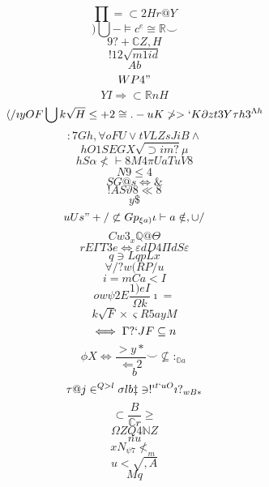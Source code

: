 \documentclass[12pt]{article}
\begin{document}
        \begin{minipage}[t][0pt]{\linewidth}

        \[\prod =\subset 2 H r @ Y\]
\[)\bigcup -\models c^{e}\cong\mathbb{R}\smile\]
\[9?+\mathbb{C} Z , H\]
\[!12\sqrt{m1id}\]
\[Ab\]
\[WP4"\]
\[YI\Rightarrow\subset\mathbb{R} n H\]
\[\langle /\imath y O F\bigcup k\sqrt{H}\leq + 2\cong . - u K\ngtr > ` K\partial z t 3 Y\tau h 3^{\Lambda h}\]
\[:7Gh, {\forall o F U}\lor t V L Z s J i B {\land}\]
\[hO1SEGX\sqrt{\supset i m ?}\mu\]
\[hS\alpha\nless\vdash 8 M 4\pi U a T u V 8\]
\[N9\leq 4\]
\[SG@s\Leftrightarrow\&\]
\[!AS\vartheta 8\ll 8\]
\[y\$\]
\[uUs"+/\not\subset G p_{\xi a )}\iota\vdash a\notin ,\cup /\]
\[Cw3_{x}\mathbb{Q} @\Theta\]
\[rE\Gamma T 3 e {\Leftrightarrow}\varepsilon d D 4\Pi d S\varepsilon\]
\[q\ni L q p L x\]
\[\forall / ? w ( R P / u\]
\[i=mCa<I\]
\[ow\psi 2 E\frac{1)eI}{\Omega k}\imath =\]
\[k\sqrt{F}\times\varsigma R 5 a y M\]
\[\iff\Gamma ? ` J F\subseteq n\]
\[\phi X\iff\frac{>y*}{\Leftarrow 2}\smile\nsubseteq :_{\mathbb{O} a}\]
\[b\]
\[\tau @ j\in^{Q>l}\sigma l b\ddagger\ni !^{\imath t ` u O}\imath ?_{wB*}\]
\[\subset\frac{B}{\mathbb{C} r}\geq\]
\[\Omega Z Q 4\mathbb{N} Z\]
\[nu\]
\[xN_{\psi 7}\nless_{m}\]
\[u<\sqrt{,A}\]
\[Mq
        \]
\end{minipage}
\end{document}
